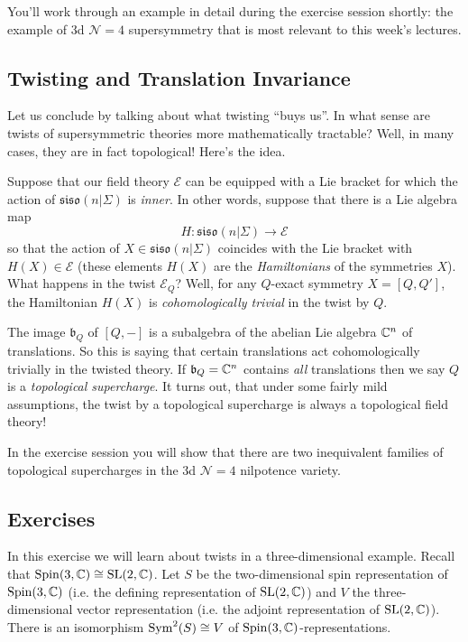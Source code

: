 You'll work through an example in detail during the exercise session shortly: the example of 3d $\mathcal N=4$ supersymmetry that is most relevant to this week's lectures.

\subsection{Twisting and Translation Invariance}
Let us conclude by talking about what twisting ``buys us''.  In what sense are twists of supersymmetric theories more mathematically tractable?  Well, in many cases, they are in fact topological!  Here's the idea.

Suppose that our field theory $\mathcal E$ can be equipped with a Lie bracket for which the action of $\mathfrak{siso}(n|\Sigma)$ is \emph{inner}.  In other words, suppose that there is a Lie algebra map
\[H \colon \mathfrak{siso}(n|\Sigma) \to \mathcal E\]
so that the action of $X \in \mathfrak{siso}(n|\Sigma)$ coincides with the Lie bracket with $H(X) \in \mathcal E$ (these elements $H(X)$ are the \emph{Hamiltonians} of the symmetries $X$).  What happens in the twist $\mathcal E_Q$?  Well, for any $Q$-exact symmetry $X = [Q,Q']$, the Hamiltonian $H(X)$ is \emph{cohomologically trivial} in the twist by $Q$.

The image $\mathfrak b_Q$ of $[Q,-]$ is a subalgebra of the abelian Lie algebra $\mathbb{C}^n$ of translations.  So this is saying that certain translations act cohomologically trivially in the twisted theory.  If $\mathfrak b_Q = \mathbb{C}^n$ contains \emph{all} translations then we say $Q$ is a \emph{topological supercharge}.  It turns out, that under some fairly mild assumptions, the twist by a topological supercharge is always a topological field theory!

In the exercise session you will show that there are two inequivalent families of topological supercharges in the 3d $\mathcal N=4$ nilpotence variety.

\subsection{Exercises}
In this exercise we will learn about twists in a three-dimensional example. Recall that $\mathrm{Spin}(3, \mathbb{C}) \cong \mathrm{SL}(2, \mathbb{C})$. Let $S$ be the two-dimensional spin representation of $\mathrm{Spin}(3, \mathbb{C})$ (i.e. the defining representation of $\mathrm{SL}(2, \mathbb{C})$) and $V$ the three-dimensional vector representation (i.e. the adjoint representation of $\mathrm{SL}(2, \mathbb{C})$). There is an isomorphism $\operatorname{Sym}^2(S)\cong V$ of $\mathrm{Spin}(3, \mathbb{C})$-representations.


